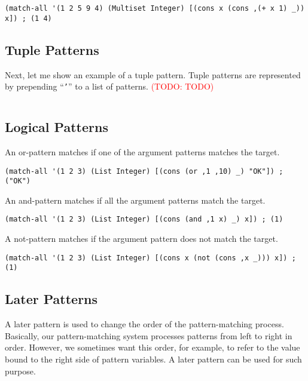 \documentclass[acmlarge]{acmart}
\newcommand{\todo}[1]{\textcolor{red}{(TODO: #1)}}
\begin{document}
\begin{lstlisting}[language=egison]
(match-all '(1 2 5 9 4) (Multiset Integer) [(cons x (cons ,(+ x 1) _)) x]) ; (1 4)
\end{lstlisting}

\subsection{Tuple Patterns}

Next, let me show an example of a tuple pattern.
Tuple patterns are represented by prepending ``\texttt{'}'' to a list of patterns.
\todo{TODO}

\begin{lstlisting}[language=egison]
\end{lstlisting}

\subsection{Logical Patterns}

An or-pattern matches if one of the argument patterns matches the target.

\begin{lstlisting}[language=egison]
(match-all '(1 2 3) (List Integer) [(cons (or ,1 ,10) _) "OK"]) ; ("OK")
\end{lstlisting}

An and-pattern matches if all the argument patterns match the target.

\begin{lstlisting}[language=egison]
(match-all '(1 2 3) (List Integer) [(cons (and ,1 x) _) x]) ; (1)
\end{lstlisting}

A not-pattern matches if the argument pattern does not match the target.

\begin{lstlisting}[language=egison]
(match-all '(1 2 3) (List Integer) [(cons x (not (cons ,x _))) x]) ; (1)
\end{lstlisting}

\subsection{Later Patterns}

A later pattern is used to change the order of the pattern-matching process. Basically, our pattern-matching system processes patterns from left to right in order. However, we sometimes want this order, for example, to refer to the value bound to the right side of pattern variables. A later pattern can be used for such purpose.
\end{document}
